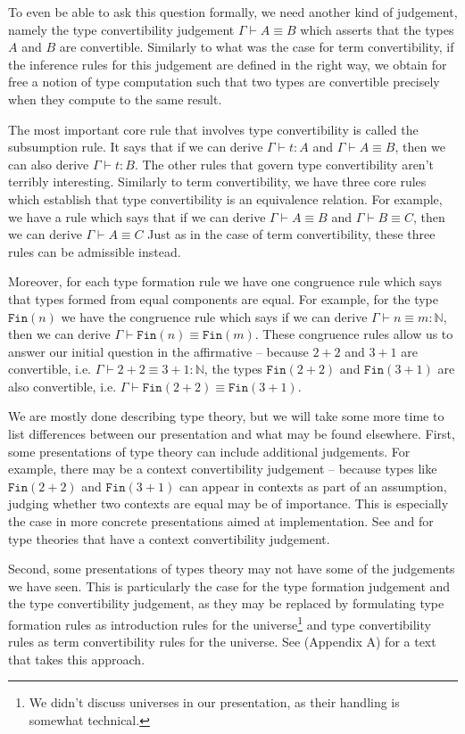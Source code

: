 \documentclass[declaration,mgr,english,shortabstract]{iithesis}
\newcommand{\m}[1]{\texttt{#1}}
\newcommand{\typeconv}[3]{#1 \vdash #2 \equiv #3}
\newcommand{\term}[3]{#1 \vdash #2 : #3}
\newcommand{\termconv}[4]{#1 \vdash #2 \equiv #3 : #4}
\newcommand{\N}{\mathbb{N}}
\newcommand{\Fin}[1]{\m{Fin}(#1)}
\begin{document}
To even be able to ask this question formally, we need another kind of judgement, namely the type convertibility judgement $\typeconv{\Gamma}{A}{B}$ which asserts that the types $A$ and $B$ are convertible. Similarly to what was the case for term convertibility, if the inference rules for this judgement are defined in the right way, we obtain for free a notion of type computation such that two types are convertible precisely when they compute to the same result.

The most important core rule that involves type convertibility is called the subsumption rule. It says that if we can derive $\term{\Gamma}{t}{A}$ and $\typeconv{\Gamma}{A}{B}$, then we can also derive $\term{\Gamma}{t}{B}$. The other rules that govern type convertibility aren't terribly interesting. Similarly to term convertibility, we have three core rules which establish that type convertibility is an equivalence relation. For example, we have a rule which says that if we can derive $\typeconv{\Gamma}{A}{B}$ and $\typeconv{\Gamma}{B}{C}$, then we can derive $\typeconv{\Gamma}{A}{C}$ Just as in the case of term convertibility, these three rules can be admissible instead.

Moreover, for each type formation rule we have one congruence rule which says that types formed from equal components are equal. For example, for the type $\Fin{n}$ we have the congruence rule which says if we can derive $\termconv{\Gamma}{n}{m}{\N}$, then we can derive $\typeconv{\Gamma}{\Fin{n}}{\Fin{m}}$. These congruence rules allow us to answer our initial question in the affirmative -- because $2 + 2$ and $3 + 1$ are convertible, i.e. $\termconv{\Gamma}{2 + 2}{3 + 1}{\N}$, the types $\Fin{2 + 2}$ and $\Fin{3 + 1}$ are also convertible, i.e. $\typeconv{\Gamma}{\Fin{2 + 2}}{\Fin{3 + 1}}$.

We are mostly done describing type theory, but we will take some more time to list differences between our presentation and what may be found elsewhere. First, some presentations of type theory can include additional judgements. For example, there may be a context convertibility judgement -- because types like $\Fin{2 + 2}$ and $\Fin{3 + 1}$ can appear in contexts as part of an assumption, judging whether two contexts are equal may be of importance. This is especially the case in more concrete presentations aimed at implementation. See \cite{Danielsson} and \cite{EatItself} for type theories that have a context convertibility judgement.

Second, some presentations of types theory may not have some of the judgements we have seen. This is particularly the case for the type formation judgement and the type convertibility judgement, as they may be replaced by formulating type formation rules as introduction rules for the universe\footnote{We didn't discuss universes in our presentation, as their handling is somewhat technical.} and type convertibility rules as term convertibility rules for the universe. See \cite{HoTTBook} (Appendix A) for a text that takes this approach.
\end{document}
